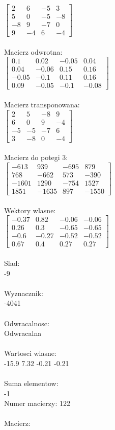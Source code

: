 \documentclass[a4paper,12pt]{article}
\begin{document}
$\begin{bmatrix} 2&6&-5&3\\5&0&-5&-8\\-8&9&-7&0\\9&-4&6&-4 \end{bmatrix}$
\\
\\
Macierz odwrotna:\\

$\begin{bmatrix} 0.1&0.02&-0.05&0.04\\0.04&-0.06&0.15&0.16\\-0.05&-0.1&0.11&0.16\\0.09&-0.05&-0.1&-0.08 \end{bmatrix}$
\\
\\
Macierz transponowana:\\

$\begin{bmatrix} 2&5&-8&9\\6&0&9&-4\\-5&-5&-7&6\\3&-8&0&-4 \end{bmatrix}$
\\
\\
Macierz do potegi 3:\\

$\begin{bmatrix} -613&939&-695&879\\768&-662&573&-390\\-1601&1290&-754&1527\\1851&-1635&897&-1550 \end{bmatrix}$
\\
\\
Wektory wlasne:\\

$\begin{bmatrix} -0.37&0.82&-0.06&-0.06\\0.26&0.3&-0.65&-0.65\\-0.6&-0.27&-0.52&-0.52\\0.67&0.4&0.27&0.27 \end{bmatrix}$
\\
\\
Slad:\\
-9
\\
\\
Wyznacznik:\\
-4041
\\
\\
Odwracalnosc:\\
Odwracalna
\\
\\
Wartosci wlasne:\\
-15.9 7.32 -0.21 -0.21
\\
\\
Suma elementow:\\
-1
\\
\newpage
Numer macierzy:
122
\\
\\
Macierz:\\
\end{document}
